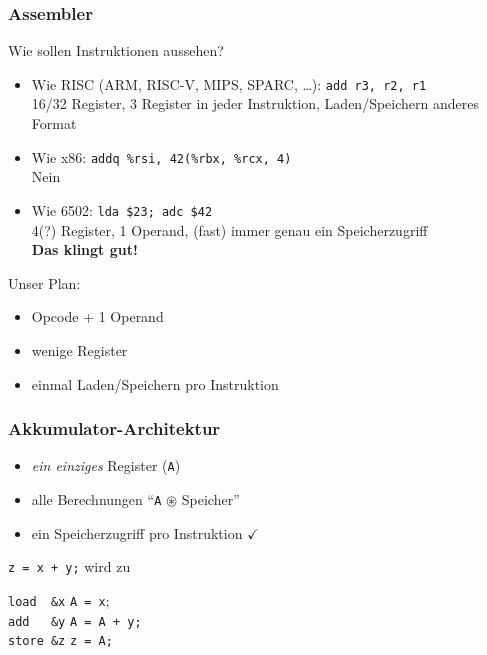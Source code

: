 \documentclass[t,aspectratio=169,usenames,dvipsnames]{beamer}
\begin{document}
\begin{frame}
  \frametitle{Assembler}

  Wie sollen Instruktionen aussehen?
  \begin{itemize}
  \item Wie RISC (ARM, RISC-V, MIPS, SPARC, \ldots): \texttt{add r3, r2, r1}\\
    16/32 Register, 3 Register in jeder Instruktion, Laden/Speichern anderes Format
  \item Wie x86: \texttt{addq \%rsi, 42(\%rbx, \%rcx, 4)}\\
    Nein
  \item Wie 6502: \texttt{lda \$23; adc \$42}\\
    4(?) Register, 1 Operand, (fast) immer genau ein Speicherzugriff\\
    \pause
    \textbf{Das klingt gut!}
  \end{itemize}

  \bigskip

  Unser Plan:
  \begin{itemize}
  \item Opcode + 1 Operand
  \item wenige Register
  \item einmal Laden/Speichern pro Instruktion
  \end{itemize}

\end{frame}

\begin{frame}
  \frametitle{Akkumulator-Architektur}

  \begin{itemize}
  \item \emph{ein einziges} Register (\texttt{A})
  \item alle Berechnungen \enquote{\texttt{A} $\circledast$ Speicher}
  \item ein Speicherzugriff pro Instruktion $\checkmark$
  \end{itemize}

  \bigskip

  \texttt{z = x + y;} wird zu

  \bigskip

  {\Large
    \texttt{load~~\&x} \qquad \texttt{A = x};\\
    \texttt{add~~~\&y} \qquad \texttt{A = A + y;}\\
    \texttt{store~\&z} \qquad \texttt{z = A;}\\
  }
\end{frame}
\end{document}
